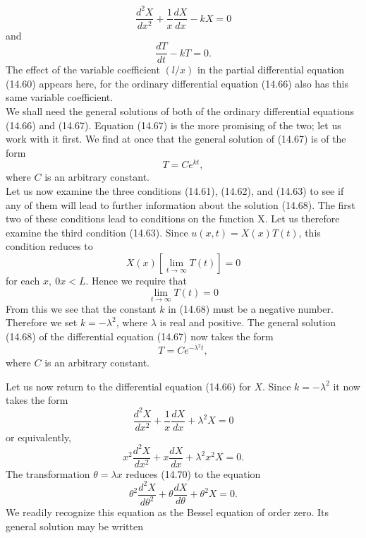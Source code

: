 \documentclass[11pt,a4paper, twoside]{report}
\begin{document}
	\begin{equation}\tag{14.66}
		\frac{d^2X}{dx^2} + \frac{1}{x}\frac{dX}{dx} - kX = 0
	\end{equation}
	and
	\begin{equation}\tag{14.67}
		\frac{dT}{dt} - kT = 0.
	\end{equation}
	The effect of the variable coefficient $(l/x)$ in the partial differential equation (14.60) appears here, for the ordinary differential equation (14.66) also has this same variable coefficient.\\
	We shall need the general solutions of both of the ordinary differential equations (14.66) and (14.67). Equation (14.67) is the more promising of the two; let us work with it first. We find at once that the general solution of (14.67) is of the form
	\begin{equation}\tag{14.68}
		T = Ce^{kt},
	\end{equation}
	where $C$ is an arbitrary constant.\\
	Let us now examine the three conditions (14.61), (14.62), and (14.63) to see if any of them will lead to further information about the solution (14.68). The first two of these conditions lead to conditions on the function X. Let us therefore examine the third condition (14.63). Since $u(x, t) = X(x)T(t)$, this condition reduces to
	$$
	X(x)[\lim_{t\to \infty} T(t)] = 0
	$$
	for each $x,\ 0 x < L$. Hence we require that
	$$
	\lim_{t \to \infty}T(t) = 0
	$$
	From this we see that the constant $k$ in (14.68) must be a negative number. Therefore we set $k = -\lambda^2$, where $\lambda$ is real and positive. The general solution (14.68) of the differential equation (14.67) now takes the form
	\begin{equation}\tag{14.69}
		T = Ce^{-\lambda^2 t},
	\end{equation}
	where $C$ is an arbitrary constant.\par
	Let us now return to the differential equation (14.66) for $X$. Since $k = -\lambda^2$ it now takes the form
	$$
	\frac{d^2 X}{dx^2} + \frac{1}{x}\frac{dX}{dx} + \lambda^2X = 0
	$$
	or equivalently,
	\begin{equation}\tag{14.70}
		x^2\frac{d^2X}{dx^2} + x\frac{dX}{dx} + \lambda^2x^2 X =0.
	\end{equation}
	The transformation $\theta = \lambda x$ reduces (14.70) to the equation
	$$
	\theta^2 \frac{d^2X}{d\theta^2} + \theta\frac{dX}{d\theta} + \theta^2X = 0.
	$$
	We readily recognize this equation as the Bessel equation of order zero. Its general solution may be written
\end{document}
